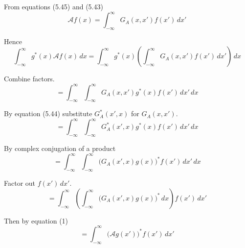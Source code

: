 


\bigskip
From equations (5.45) and (5.43)
\begin{equation*}
\mathcal Af(x)=\int_{-\infty}^\infty G_A(x,x')f(x')\,dx'
\tag{1}
\end{equation*}

Hence
\begin{equation*}
\int_{-\infty}^\infty g^*(x)\mathcal Af(x)\,dx
=\int_{-\infty}^\infty g^*(x)
\left(\int_{-\infty}^\infty G_A(x,x')f(x')\,dx'\right)
\,dx
\end{equation*}

Combine factors.
\begin{equation*}
{}=\int_{-\infty}^\infty
\int_{-\infty}^\infty G_A(x,x')g^*(x)f(x')\,dx'
\,dx
\end{equation*}

By equation (5.44) substitute $G_A^*(x',x)$ for $G_A(x,x')$.
\begin{equation*}
{}=\int_{-\infty}^\infty
\int_{-\infty}^\infty G_A^*(x',x)g^*(x)f(x')\,dx'
\,dx
\end{equation*}

By complex conjugation of a product
\begin{equation*}
{}=\int_{-\infty}^\infty
\int_{-\infty}^\infty\big(G_A(x',x)g(x)\big)^*f(x')\,dx'
\,dx
\end{equation*}

Factor out $f(x')\,dx'$.
\begin{equation*}
{}=\int_{-\infty}^\infty
\left(\int_{-\infty}^\infty\big(G_A(x',x)g(x)\big)^*\,dx\right)f(x')\,dx'
\end{equation*}

Then by equation (1)
\begin{equation*}
{}=\int_{-\infty}^\infty\big(\mathcal Ag(x')\big)^*f(x')\,dx'
\end{equation*}


